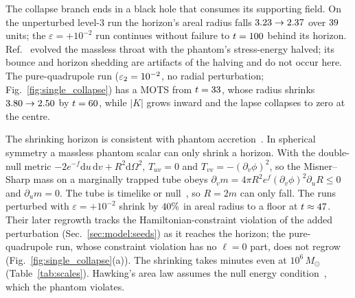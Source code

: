 \documentclass[twocolumn,floatfix,aps,prd,superscriptaddress,nofootinbib]{revtex4-2}
\begin{document}
The collapse branch ends in a black hole that consumes its supporting field. On the unperturbed level-3 run the horizon's areal radius falls $3.23\to2.37$ over $39$ units; the $\varepsilon=+10^{-2}$ run continues without failure to $t=100$ behind its horizon. Ref.~\cite{shirokov2026} evolved the massless throat with the phantom's stress-energy halved; its bounce and horizon shedding are artifacts of the halving and do not occur here. The pure-quadrupole run ($\varepsilon_2=10^{-2}$, no radial perturbation; Fig.~\ref{fig:single_collapse}) has a MOTS from $t=33$, whose radius shrinks $3.80\to2.50$ by $t=60$, while $|K|$ grows inward and the lapse collapses to zero at the centre.

The shrinking horizon is consistent with phantom accretion~\cite{babichev2004,gao2008}. In spherical symmetry a massless phantom scalar can only shrink a horizon. With the double-null metric $-2e^{-f}\mathrm{d}u\,\mathrm{d}v+R^2\mathrm{d}\Omega^2$, $T_{uv}=0$ and $T_{vv}=-(\partial_v\phi)^2$, so the Misner--Sharp mass on a marginally trapped tube obeys $\partial_v m=4\pi R^2e^{f}(\partial_v\phi)^2\partial_uR\le0$ and $\partial_u m=0$. The tube is timelike or null~\cite{hayward1996,hayward1994}, so $R=2m$ can only fall. The runs perturbed with $\varepsilon=+10^{-2}$ shrink by $40\%$ in areal radius to a floor at $t\approx47$. Their later regrowth tracks the Hamiltonian-constraint violation of the added perturbation (Sec.~\ref{sec:model:seeds}) as it reaches the horizon; the pure-quadrupole run, whose constraint violation has no $\ell=0$ part, does not regrow (Fig.~\ref{fig:single_collapse}(a)). The shrinking takes minutes even at $10^{6}\,M_\odot$ (Table~\ref{tab:scales}). Hawking's area law assumes the null energy condition~\cite{hawking1971,ashtekar_krishnan2004}, which the phantom violates.
\end{document}

